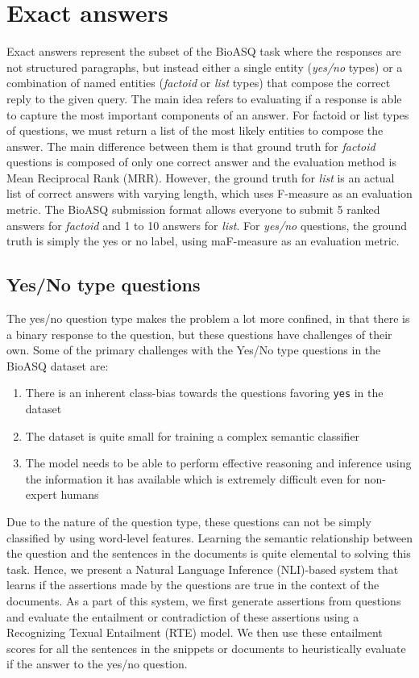 \documentclass[11pt,a4paper]{article}
\begin{document}
\section{Exact answers}
\label{approach2}
Exact answers represent the subset of the BioASQ task where the responses are not structured paragraphs, but instead either a single entity (\textit{yes/no} types) or a combination of named entities (\textit{factoid} or \textit{list} types) that compose the correct reply to the given query. The main idea refers to evaluating if a response is able to capture the most important components of an answer. For factoid or list types of questions, we must return a list of the most likely entities to compose the answer. The main difference between them is that ground truth for \textit{factoid} questions is composed of only one correct answer and the evaluation method is Mean Reciprocal Rank (MRR). However, the ground truth for \textit{list} is an actual list of correct answers with varying length, which uses F-measure as an evaluation metric. The BioASQ submission format allows everyone to submit 5 ranked answers for \textit{factoid} and 1 to 10 answers for \textit{list}. For \textit{yes/no} questions, the ground truth is simply the yes or no label, using maF-measure as an evaluation metric.


\subsection{Yes/No type questions}

The yes/no question type makes the problem a lot more confined, in that there is a binary response to the question, but these questions have challenges of their own. Some of the primary challenges with the Yes/No type questions in the BioASQ dataset are:

\begin{enumerate}
    \item There is an inherent class-bias towards the questions favoring \texttt{yes} in the dataset
    \item The dataset is quite small for training a complex semantic classifier
    \item The model needs to be able to perform effective reasoning and inference using the information it has available which is extremely difficult even for non-expert humans
\end{enumerate}

Due to the nature of the question type, these questions can not be simply classified by using word-level features. Learning the semantic relationship between the question and the sentences in the documents is quite elemental to solving this task. Hence, we present a Natural Language Inference (NLI)-based system that learns if the assertions made by the questions are true in the context of the documents. As a part of this system, we first generate assertions from questions and evaluate the entailment or contradiction of these assertions using a Recognizing Texual Entailment (RTE) model. We then use these entailment scores for all the sentences in the snippets or documents to heuristically evaluate if the answer to the yes/no question.
\end{document}
